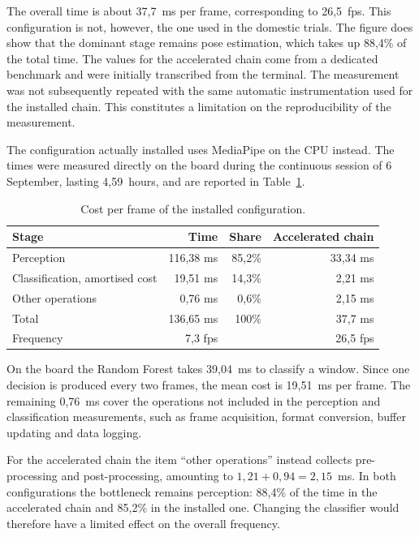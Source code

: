 The overall time is about 37,7~ms per frame, corresponding to 26,5~fps. This configuration is not, however, the one used in the domestic trials. The figure does show that the dominant stage remains pose estimation, which takes up 88,4\% of the total time. The values for the accelerated chain come from a dedicated benchmark and were initially transcribed from the terminal. The measurement was not subsequently repeated with the same automatic instrumentation used for the installed chain. This constitutes a limitation on the reproducibility of the measurement.

The configuration actually installed uses MediaPipe on the CPU instead. The times were measured directly on the board during the continuous session of 6 September, lasting 4,59~hours, and are reported in Table~\ref{tab:costo_installato}.

\begin{table}[htbp]
\centering
\caption{Cost per frame of the installed configuration.}
\label{tab:costo_installato}
\begin{tabularx}{\textwidth}{Xrrr}
\toprule
\textbf{Stage} & \textbf{Time} & \textbf{Share} & \textbf{Accelerated chain} \\
\midrule
Perception & 116,38 ms & 85,2\% & 33,34 ms \\
Classification, amortised cost & 19,51 ms & 14,3\% & 2,21 ms \\
Other operations & 0,76 ms & 0,6\% & 2,15 ms \\
\midrule
Total & 136,65 ms & 100\% & 37,7 ms \\
Frequency & 7,3 fps & & 26,5 fps \\
\bottomrule
\end{tabularx}

\end{table}

On the board the Random Forest takes 39,04~ms to classify a window. Since one decision is produced every two frames, the mean cost is 19,51~ms per frame. The remaining 0,76~ms cover the operations not included in the perception and classification measurements, such as frame acquisition, format conversion, buffer updating and data logging.

For the accelerated chain the item ``other operations'' instead collects pre-processing and post-processing, amounting to $1{,}21+0{,}94=2{,}15$~ms.
In both configurations the bottleneck remains perception: 88,4\% of the time in the accelerated chain and 85,2\% in the installed one. Changing the classifier would therefore have a limited effect on the overall frequency.


